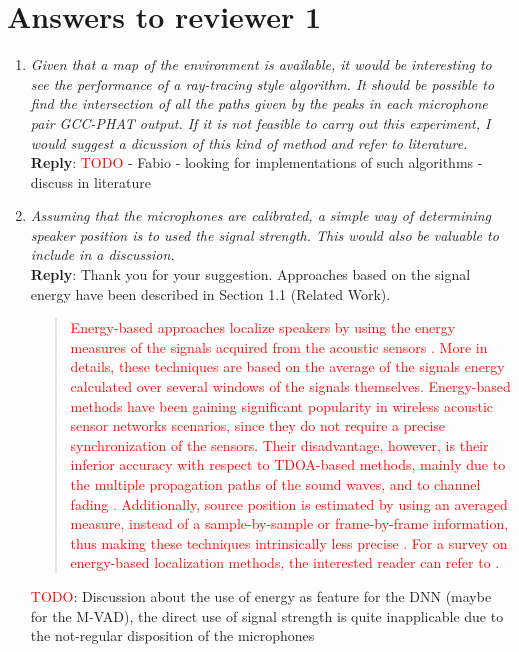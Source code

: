 \documentclass[11pt, technote, letterpaper, oneside, onecolumn]{IEEEtran}
\begin{document}
\section{Answers to reviewer 1}\label{sec:rev1}
\begin{enumerate}
\item \textit{Given that a map of the environment is available, it would be interesting to see the performance of a ray-tracing style algorithm. It should be possible to find the intersection of all the paths given by the peaks in each microphone pair GCC-PHAT output. If it is not feasible to carry out this experiment, I would suggest a dicussion of this kind of method and refer to literature.\\}
\textbf{Reply}: \textcolor{red}{TODO} - Fabio - looking for implementations of such algorithms - discuss in literature

\item \textit{Assuming that the microphones are calibrated, a simple way of determining speaker position is to used the signal strength. This would also be valuable to include in a discussion.\\}
\textbf{Reply}: Thank you for your suggestion. Approaches based on the signal energy have been described in Section 1.1 (Related Work). 

\begin{quote}
\textcolor{red}{
Energy-based approaches localize speakers by using the energy measures of the signals acquired from the acoustic sensors \cite{Cobos2017,Meng2017}. More in details, these techniques are based on the average of the signals energy calculated over several windows of the signals themselves. Energy-based methods have been gaining significant popularity in wireless acoustic sensor networks scenarios, since they do not require a precise synchronization of the sensors. Their disadvantage, however, is their inferior accuracy with respect to TDOA-based methods, mainly due to the multiple propagation paths of the sound waves, and to channel fading \cite{Cobos2017}. Additionally, source position is estimated by using an averaged measure, instead of a sample-by-sample or frame-by-frame information, thus making these techniques intrinsically less precise \cite{Cobos2017}. For a survey on energy-based localization methods, the interested reader can refer to \cite{Cobos2017,Meng2017}.}
\end{quote}

\textcolor{red}{TODO}: Discussion about the use of energy as feature for the DNN (maybe for the M-VAD), the direct use of signal strength is quite inapplicable due to the not-regular disposition of the microphones


\end{enumerate}
\end{document}
